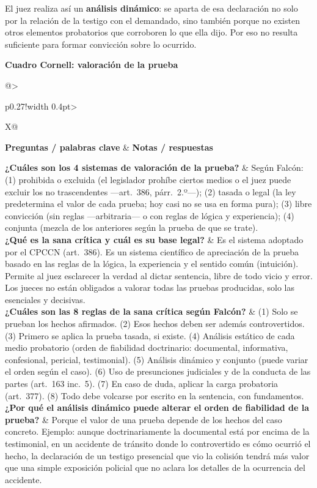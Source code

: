 \documentclass[12pt,oneside]{book}
\makeatletter
\newcommand{\cornelltitle}[1]{\par\bigskip\noindent\textbf{\sffamily Cuadro Cornell: #1}\par\nopagebreak\smallskip}
\newcommand{\cqrow}[2]{\textbf{#1} & #2 \\[0.5em]}
\newcommand{\cornellblock}[1]{%
  \noindent\begin{tabularx}{\textwidth}{@{}>{\raggedright\arraybackslash}p{0.27\textwidth}!{\vrule width 0.4pt}>{\raggedright\arraybackslash}X@{}}
  \toprule
  \textbf{Preguntas / palabras clave} & \textbf{Notas / respuestas} \\
  \midrule
  #1
  \bottomrule
  \end{tabularx}\par}
\makeatother
\begin{document}
El juez realiza así un \textbf{análisis dinámico}: se aparta de esa declaración no solo por la relación de la testigo con el demandado, sino también porque no existen otros elementos probatorios que corroboren lo que ella dijo. Por eso no resulta suficiente para formar convicción sobre lo ocurrido.

\cornelltitle{valoración de la prueba}
\cornellblock{
\cqrow{¿Cuáles son los 4 sistemas de valoración de la prueba?}{Según Falcón: (1) prohibida o excluida (el legislador prohíbe ciertos medios o el juez puede excluir los no trascendentes ---art.~386, párr.~2.º---); (2) tasada o legal (la ley predetermina el valor de cada prueba; hoy casi no se usa en forma pura); (3) libre convicción (sin reglas ---arbitraria--- o con reglas de lógica y experiencia); (4) conjunta (mezcla de los anteriores según la prueba de que se trate).
}
\cqrow{¿Qué es la sana crítica y cuál es su base legal?}{Es el sistema adoptado por el CPCCN (art.~386). Es un sistema científico de apreciación de la prueba basado en las reglas de la lógica, la experiencia y el sentido común (intuición). Permite al juez esclarecer la verdad al dictar sentencia, libre de todo vicio y error. Los jueces no están obligados a valorar todas las pruebas producidas, solo las esenciales y decisivas.
}
\cqrow{¿Cuáles son las 8 reglas de la sana crítica según Falcón?}{(1) Solo se prueban los hechos afirmados. (2) Esos hechos deben ser además controvertidos. (3) Primero se aplica la prueba tasada, si existe. (4) Análisis estático de cada medio probatorio (orden de fiabilidad doctrinario: documental, informativa, confesional, pericial, testimonial). (5) Análisis dinámico y conjunto (puede variar el orden según el caso). (6) Uso de presunciones judiciales y de la conducta de las partes (art.~163 inc.~5). (7) En caso de duda, aplicar la carga probatoria (art.~377). (8) Todo debe volcarse por escrito en la sentencia, con fundamentos.
}
\cqrow{¿Por qué el análisis dinámico puede alterar el orden de fiabilidad de la prueba?}{Porque el valor de una prueba depende de los hechos del caso concreto. Ejemplo: aunque doctrinariamente la documental está por encima de la testimonial, en un accidente de tránsito donde lo controvertido es cómo ocurrió el hecho, la declaración de un testigo presencial que vio la colisión tendrá más valor que una simple exposición policial que no aclara los detalles de la ocurrencia del accidente.
}
}
\medskip
\end{document}
